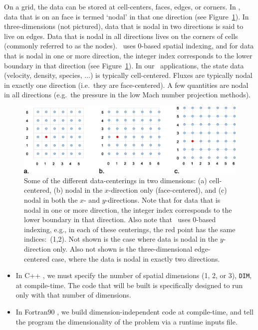 On a grid, the data can be stored at cell-centers, faces, edges, or
corners.  In \BoxLib, data that is on an face is termed `nodal'
in that one direction (see Figure~\ref{fig:dataloc}).  In three-dimensions (not pictured),
data that is nodal in two directions is said to live on edges.  Data that is nodal in
all directions lives on the corners of cells (commonly referred to as the nodes).
\BoxLib\ uses $0$-based spatial indexing, and for data that is nodal in one or more direction,
the integer index corresponds to the lower boundary in that direction (see Figure~\ref{fig:dataloc}).
In our \BoxLib\ applications, the state data (velocity, density, 
species, $\ldots$) is typically cell-centered.  Fluxes are typically nodal in exactly
one direction (i.e.~they are face-centered).  A few quantities are nodal in all 
directions (e.g.~the pressure in the low Mach number projection methods).
\begin{figure}[tb]
\centering
\includegraphics[width=6.5in]{./Introduction/data_loc2}
\caption{\label{fig:dataloc} Some of the different data-centerings in two dimensions:
(a) cell-centered, (b) nodal in the $x$-direction only (face-centered), and (c) nodal in
both the $x$- and $y$-directions.  Note that for data that is nodal in one or more direction,
the integer index corresponds to the lower boundary in that direction.
Also note that \BoxLib\ uses $0$-based indexing, e.g., in each of these centerings, 
the red point has the same indices:\ (1,2).
Not shown is the case where data is nodal in the $y$-direction only.  
Also not shown is the three-dimensional edge-centered case, where the data
is nodal in exactly two directions.  }
\end{figure}

\begin{itemize}
\item In C++ \BoxLib, we must specify the number of spatial dimensions (1, 2, or 3), 
{\tt DIM}, at compile-time.  The code that will be built is specifically designed to 
run only with that number of dimensions.
\item In Fortran90 \BoxLib, we build dimension-independent code at compile-time, 
and tell the program the dimensionality of the problem via a runtime inputs file.
\end{itemize}

